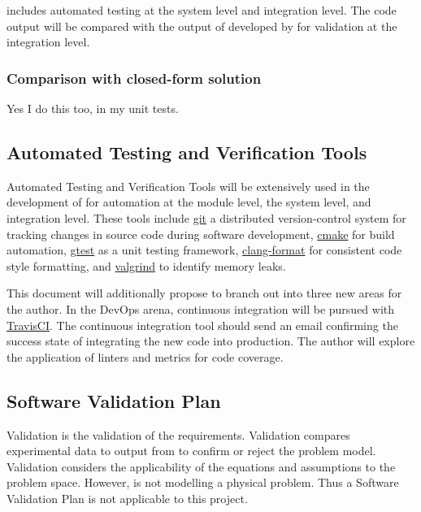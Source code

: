 \documentclass[12pt, titlepage]{article}
\begin{document}
 includes automated testing at the system level
and integration level. The code output
will be compared with the output of \rdcon developed by \cite{chang1982} for validation at
the integration level.

\subsubsection{Comparison with closed-form solution}
Yes I do this too, in my unit tests.


\subsection{Automated Testing and Verification Tools}

Automated Testing and Verification Tools will be extensively used in the development of 
for automation at the module level, the system level, and integration level.
These tools include
\href{https://git.kernel.org/pub/scm/git/git.git}{git} a distributed version-control system
for tracking changes in source code during software development,
\href{https://cmake.org/}{cmake} for build automation,
\href{https://github.com/google/googletest}{gtest}
as a unit testing framework, \href{http://clang.llvm.org/docs/ClangFormat.html}{clang-format}
for consistent code style formatting, and \href{https://www.valgrind.org}{valgrind}
to identify memory leaks.

This document will additionally propose to branch out into three new areas for the author.
In the DevOps arena,
continuous integration will be pursued with \href{https://travis-ci.org}{TravisCI}.
The continuous integration tool should send an email confirming the success state
of integrating the new code into production.
The author will explore the application of linters and metrics for code coverage.

\subsection{Software Validation Plan}

Validation is the validation of the requirements. Validation compares experimental
data to output from  to confirm or reject the problem model. Validation
considers the applicability of the equations and assumptions to the problem space.
However,  is not modelling a physical problem. Thus a
Software Validation Plan is not applicable to this project.
\end{document}
